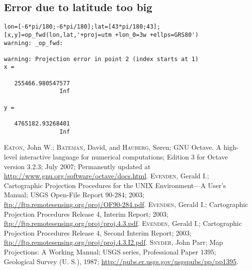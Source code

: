 \documentclass[10pt,a4paper]{article}
\begin{document}
\subsection{Error due to latitude too big}

\begin{verbatim}
lon=[-6*pi/180;-6*pi/180];lat=[43*pi/180;43];
[x,y]=op_fwd(lon,lat,'+proj=utm +lon_0=3w +ellps=GRS80')
warning: _op_fwd:

warning: Projection error in point 2 (index starts at 1)
x =

   255466.980547577
                Inf

y =

   4765182.93268401
                Inf
\end{verbatim}

\begin{thebibliography}{99}
 \textsc{Eaton}, John W.; \textsc{Bateman}, David, and
                 \textsc{Hauberg}, S\o{}ren; GNU Octave. A high-level interactive
                 language for numerical computations; Edition 3 for Octave
                 version 3.2.3; July 2007; Permanently updated at
                 \url{http://www.gnu.org/software/octave/docs.html}.
 \textsc{Evenden}, Gerald I.; Cartographic Projection
                  Procedures for the UNIX Environment---A User's Manual; USGS
                  Open-File Report 90-284; 2003;
                  \url{ftp://ftp.remotesensing.org/proj/OF90-284.pdf}.
 \textsc{Evenden}, Gerald I.; Cartographic Projection
                  Procedures Release 4, Interim Report; 2003;
                  \url{ftp://ftp.remotesensing.org/proj/proj.4.3.pdf}.
 \textsc{Evenden}, Gerald I.; Cartographic Projection
                  Procedures Release 4, Second Interim Report; 2003;
                  \url{ftp://ftp.remotesensing.org/proj/proj.4.3.I2.pdf}.
 \textsc{Snyder}, John Parr; Map Projections: A Working Manual;
                 USGS series, Professional Paper 1395; Geological Survey
                 (U. S.), 1987;
                 \url{http://pubs.er.usgs.gov/usgspubs/pp/pp1395}.
\end{thebibliography}
\end{document}
